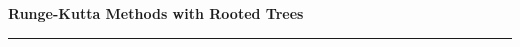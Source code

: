 \documentclass[12pt]{amsart}
\newcommand{\HRule}{\rule{\linewidth}{0.5mm}}
\theoremstyle{definition}
\begin{document}
  \begin{titlepage}
  \centering
  
  \huge{\textbf{Runge-Kutta Methods with Rooted Trees}}
  \\[0.1cm]
  \HRule
  \vfill
  
% 
%  
%  
%  

\end{titlepage}
\end{document}
